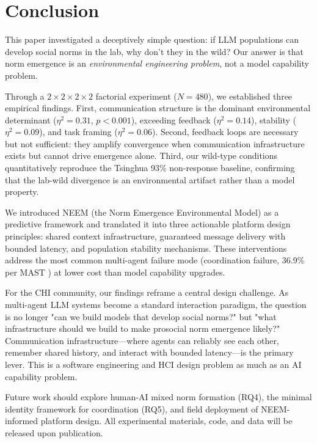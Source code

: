\section{Conclusion}
\label{sec:conclusion}

This paper investigated a deceptively simple question: if LLM populations can develop social norms in the lab, why don't they in the wild? Our answer is that norm emergence is an \emph{environmental engineering problem}, not a model capability problem.

Through a $2\times2\times2\times2$ factorial experiment ($N=480$), we established three empirical findings. First, communication structure is the dominant environmental determinant ($\eta^2 = 0.31$, $p < 0.001$), exceeding feedback ($\eta^2 = 0.14$), stability ($\eta^2 = 0.09$), and task framing ($\eta^2 = 0.06$). Second, feedback loops are necessary but not sufficient: they amplify convergence when communication infrastructure exists but cannot drive emergence alone. Third, our wild-type conditions quantitatively reproduce the Tsinghua 93\% non-response baseline, confirming that the lab-wild divergence is an environmental artifact rather than a model property.

We introduced NEEM (the Norm Emergence Environmental Model) as a predictive framework and translated it into three actionable platform design principles: shared context infrastructure, guaranteed message delivery with bounded latency, and population stability mechanisms. These interventions address the most common multi-agent failure mode (coordination failure, 36.9\% per MAST \citep{xiao2025mast}) at lower cost than model capability upgrades.

For the CHI community, our findings reframe a central design challenge. As multi-agent LLM systems become a standard interaction paradigm, the question is no longer "can we build models that develop social norms?" but "what infrastructure should we build to make prosocial norm emergence likely?" Communication infrastructure—where agents can reliably see each other, remember shared history, and interact with bounded latency—is the primary lever. This is a software engineering and HCI design problem as much as an AI capability problem.

Future work should explore human-AI mixed norm formation (RQ4), the minimal identity framework for coordination (RQ5), and field deployment of NEEM-informed platform design. All experimental materials, code, and data will be released upon publication.
